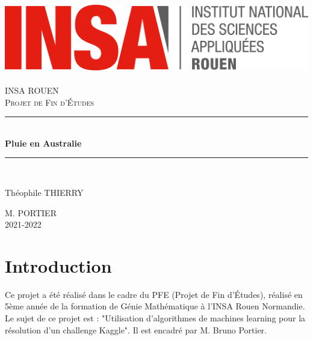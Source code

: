 \documentclass{article}
\begin{document}
\newcommand{\HRule}{\rule{\linewidth}{0.5mm}}

\begin{titlepage}
  \begin{sffamily}
  \begin{center}
    \hfill
    \includegraphics[scale=0.06]{./Images/logoINSARouen.png}~\\[1.5cm]

    \textsc{\LARGE INSA ROUEN}\\[1cm]

    \textsc{\Large Projet de Fin d'Études}\\[1cm]

    \HRule \\[0.4cm]
    { \huge \bfseries Pluie en Australie\\[0.4cm] }

    \HRule \\[1cm]

    \begin{minipage}{0.4\textwidth}
      \begin{flushleft} \large
        Théophile THIERRY\\
      \end{flushleft}
    \end{minipage}
    \begin{minipage}{0.4\textwidth}
      \begin{flushright} \large
        \textsc{M. PORTIER}\\
         2021-2022\\
      \end{flushright}
    \end{minipage}

    \vfill

  \end{center}
  \end{sffamily}
\end{titlepage}

\newpage

\tableofcontents
\listoffigures
\listoftables
\newpage

\part{Introduction}
Ce projet a été réalisé dans le cadre du PFE (Projet de Fin d'Études), réalisé en 5ème année de la formation de Génie Mathématique à l'INSA Rouen Normandie. Le sujet de ce projet est : "Utilisation d’algorithmes de machines learning pour la résolution d’un challenge Kaggle". Il est encadré par M. Bruno Portier.  
\end{document}
